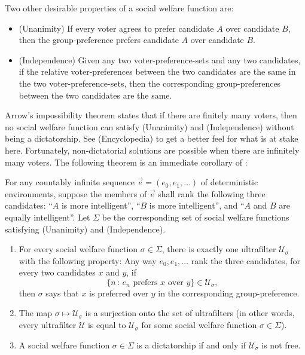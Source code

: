 \documentclass[twoside,11pt]{article}
\begin{document}
Two other desirable properties of a social welfare function are:
\begin{itemize}
    \item
    (Unanimity)
    If every voter agrees to prefer candidate $A$ over candidate $B$, then
    the group-preference prefers candidate $A$ over candidate $B$.
    \item
    (Independence)
    Given any two voter-preference-sets and any
    two candidates, if the relative voter-preferences
    between the two candidates are the same in the two voter-preference-sets, then the
    corresponding group-preferences between the two candidates are the same.
\end{itemize}
Arrow's impossibility theorem states that if there are finitely many voters, then
no social welfare function can satisfy (Unanimity) and (Independence) without being
a dictatorship. See %
(Encyclopedia) to get a better feel for what is at stake here.
Fortunately, non-dictatorial solutions are possible when there are infinitely many
voters.
The following theorem is an immediate corollary of \citet{kirman}:

\begin{theorem}
\label{shoulderofgiants}
    For any countably infinite
    sequence $\vec{e}=(e_0,e_1,\ldots)$ of deterministic environments, suppose the
    members of $\vec{e}$
    shall rank the following three candidates: ``$A$ is more intelligent'',
    ``$B$ is more intelligent'', and ``$A$ and $B$ are equally intelligent''.
    Let $\Sigma$ be the corresponding set of social welfare functions satisfying
    (Unanimity) and (Independence).
    \begin{enumerate}
        \item
        For every social welfare function $\sigma\in\Sigma$, there is exactly one
        ultrafilter $\mathscr U_\sigma$ with the following property:
        Any way $e_0,e_1,\ldots$ rank the three candidates, for every two candidates
        $x$ and $y$,
        if
        \[
            \{n\,:\,\mbox{$e_n$ prefers $x$ over $y$}\} \in \mathscr U_\sigma,
        \]
        then $\sigma$ says that $x$ is preferred
        over $y$ in the corresponding group-preference.
        \item
        The map $\sigma\mapsto \mathscr U_\sigma$ is a surjection onto the set of ultrafilters
        (in other words, every ultrafilter $\mathscr U$ is equal to $\mathscr U_\sigma$ for
        some social welfare function $\sigma\in\Sigma$).
        \item
        A social welfare function $\sigma\in\Sigma$ is a dictatorship if and only if
        $\mathscr U_\sigma$ is not free.
    \end{enumerate}
\end{theorem}
\end{document}

